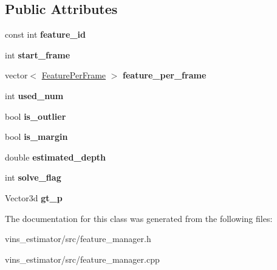 \subsection*{Public Attributes}
\begin{DoxyCompactItemize}
\item 
\mbox{\label{classFeaturePerId_aade15aa05d4a2987799dc5f93c935ab7}} 
const int {\bfseries feature\+\_\+id}
\item 
\mbox{\label{classFeaturePerId_ae94b08e60499ed7713550bc1f58ade88}} 
int {\bfseries start\+\_\+frame}
\item 
\mbox{\label{classFeaturePerId_ac882d3d3e99ef91f792547a7368a79ca}} 
vector$<$ \hyperlink{classFeaturePerFrame}{Feature\+Per\+Frame} $>$ {\bfseries feature\+\_\+per\+\_\+frame}
\item 
\mbox{\label{classFeaturePerId_a0e9055804ffe0482623684429f3c2b25}} 
int {\bfseries used\+\_\+num}
\item 
\mbox{\label{classFeaturePerId_a270bc723d1594cce401ceba648a61247}} 
bool {\bfseries is\+\_\+outlier}
\item 
\mbox{\label{classFeaturePerId_a75688e3a71c995b00be05e4ea595b5b6}} 
bool {\bfseries is\+\_\+margin}
\item 
\mbox{\label{classFeaturePerId_ac0377847ee5bc491bcdd233c2842ce56}} 
double {\bfseries estimated\+\_\+depth}
\item 
\mbox{\label{classFeaturePerId_a93159271cab0b9fa4a7363960bc867b0}} 
int {\bfseries solve\+\_\+flag}
\item 
\mbox{\label{classFeaturePerId_ab2a77244f3dcd4cbf385e7f81e58b99b}} 
Vector3d {\bfseries gt\+\_\+p}
\end{DoxyCompactItemize}


The documentation for this class was generated from the following files\+:\begin{DoxyCompactItemize}
\item 
vins\+\_\+estimator/src/feature\+\_\+manager.\+h\item 
vins\+\_\+estimator/src/feature\+\_\+manager.\+cpp\end{DoxyCompactItemize}
